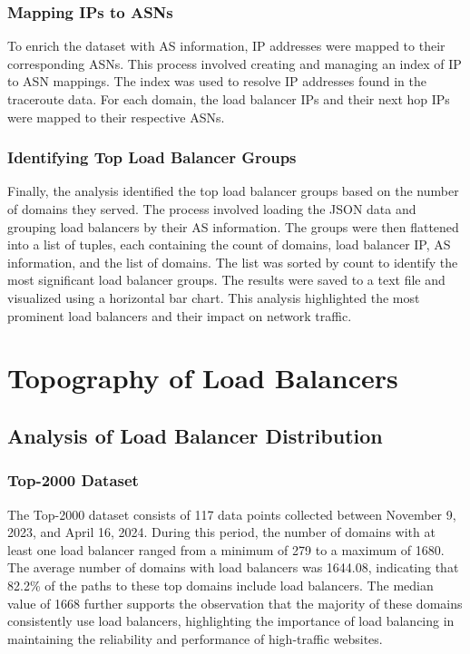 \documentclass[12pt]{cwru_thesis}
\begin{document}
\subsection{Mapping IPs to ASNs}
To enrich the dataset with AS information, IP addresses were mapped to their corresponding ASNs. This process involved creating and managing an index of IP to ASN mappings. The index was used to resolve IP addresses found in the traceroute data. For each domain, the load balancer IPs and their next hop IPs were mapped to their respective ASNs. 

\subsection{Identifying Top Load Balancer Groups}
Finally, the analysis identified the top load balancer groups based on the number of domains they served. The process involved loading the JSON data and grouping load balancers by their AS information. The groups were then flattened into a list of tuples, each containing the count of domains, load balancer IP, AS information, and the list of domains. The list was sorted by count to identify the most significant load balancer groups. The results were saved to a text file and visualized using a horizontal bar chart. This analysis highlighted the most prominent load balancers and their impact on network traffic.



\chapter{Topography of Load Balancers}

\section{Analysis of Load Balancer Distribution}

\subsection{Top-2000 Dataset}

The Top-2000 dataset consists of 117 data points collected between November 9, 2023, and April 16, 2024. During this period, the number of domains with at least one load balancer ranged from a minimum of 279 to a maximum of 1680. The average number of domains with load balancers was 1644.08, indicating that 82.2\% of the paths to these top domains include load balancers. The median value of 1668 further supports the observation that the majority of these domains consistently use load balancers, highlighting the importance of load balancing in maintaining the reliability and performance of high-traffic websites.
\end{document}

